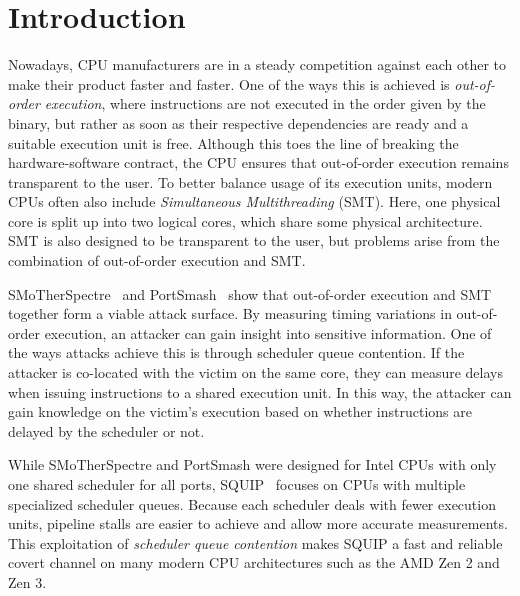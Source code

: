 \documentclass[11pt,
  titlepage=false,
]{scrreprt}
\begin{document}
\clearpage



\chapter{Introduction}
\label{ch:introduction}

Nowadays, CPU manufacturers are in a steady competition against each other to make their product faster and faster.
One of the ways this is achieved is \textit{out-of-order execution}, where instructions are not executed in the order given by the binary, but rather as soon as their respective dependencies are ready and a suitable execution unit is free.
Although this toes the line of breaking the hardware-software contract, the CPU ensures that out-of-order execution remains transparent to the user.
To better balance usage of its execution units, modern CPUs often also include \textit{Simultaneous Multithreading} (SMT).
Here, one physical core is split up into two logical cores, which share some physical architecture.
SMT is also designed to be transparent to the user, but problems arise from the combination of out-of-order execution and SMT.

SMoTherSpectre~\cite{Bhattacharyya2019} and PortSmash~\cite{Aldaya2019port} show that out-of-order execution and SMT together form a viable attack surface.
By measuring timing variations in out-of-order execution, an attacker can gain insight into sensitive information.
One of the ways attacks achieve this is through scheduler queue contention.
If the attacker is co-located with the victim on the same core, they can measure delays when issuing instructions to a shared execution unit.
In this way, the attacker can gain knowledge on the victim's execution based on whether instructions are delayed by the scheduler or not.

While SMoTherSpectre and PortSmash were designed for Intel CPUs with only one shared scheduler for all ports, SQUIP~\cite{squip} focuses on CPUs with multiple specialized scheduler queues.
Because each scheduler deals with fewer execution units, pipeline stalls are easier to achieve and allow more accurate measurements.
This exploitation of \textit{scheduler queue contention} makes SQUIP a fast and reliable covert channel on many modern CPU architectures such as the AMD Zen 2 and Zen 3.
\end{document}
